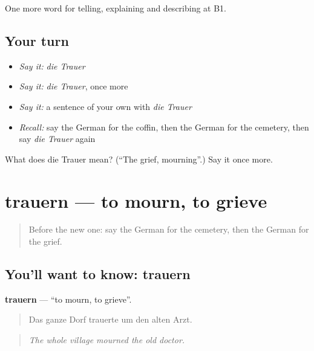 \begin{grammarlens}[title={What you've built}]
One more word for telling, explaining and describing at B1.
\end{grammarlens}

\subsection*{Your turn}
\begin{itemize}
\raggedright
  \item \emph{Say it:} \emph{die Trauer}
  \item \emph{Say it:} \emph{die Trauer}, once more
  \item \emph{Say it:} a sentence of your own with \emph{die Trauer}
  \item \emph{Recall:} say the German for the coffin, then the German for the cemetery, then say \emph{die Trauer} again
\end{itemize}

\begin{tcolorbox}[breakable,colback=teal!4,colframe=teal!35!black,title={Before you move on}]
What does die Trauer mean? (\textquotedblleft{}The grief, mourning\textquotedblright{}.) Say it once more.
\end{tcolorbox}
\section[trauern]{trauern — to mourn, to grieve}

\label{lesson:GE-C304-trauern}



\begin{quote}
Before the new one: say the German for the cemetery, then the German for the grief.
\end{quote}

\subsection*{You'll want to know: trauern}
\textbf{trauern} — \textquotedblleft{}to mourn, to grieve\textquotedblright{}.

\begin{quote}
Das ganze Dorf trauerte um den alten Arzt.
\end{quote}

\begin{quote}
\emph{The whole village mourned the old doctor.}
\end{quote}

